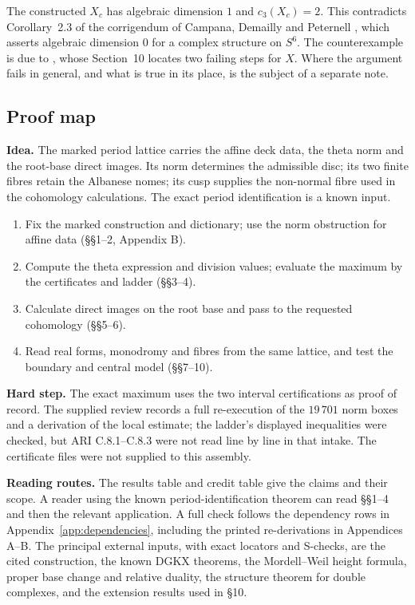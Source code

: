The constructed $X_c$ has algebraic dimension $1$ and $c_3(X_c)=2$. This contradicts Corollary~2.3 of the corrigendum of Campana, Demailly and Peternell \cite[Corollary 2.3]{CDP20}, which asserts algebraic dimension $0$ for a complex structure on $S^6$. The counterexample is due to \cite[Main Theorem; Section 10]{AC26}, whose Section~10 locates two failing steps for $X$. Where the argument fails in general, and what is true in its place, is the subject of a separate note.

\subsection*{Proof map}
\textbf{Idea.} The marked period lattice carries the affine deck data, the theta norm and the root-base direct images. Its norm determines the admissible disc; its two finite fibres retain the Albanese nomes; its cusp supplies the non-normal fibre used in the cohomology calculations. The exact period identification is a known input.
\begin{enumerate}[leftmargin=*,label=\arabic*.]
\item Fix the marked construction and dictionary; use the norm obstruction for affine data (\S\S1--2, Appendix B).
\item Compute the theta expression and division values; evaluate the maximum by the certificates and ladder (\S\S3--4).
\item Calculate direct images on the root base and pass to the requested cohomology (\S\S5--6).
\item Read real forms, monodromy and fibres from the same lattice, and test the boundary and central model (\S\S7--10).
\end{enumerate}
\textbf{Hard step.} The exact maximum uses the two interval certifications as proof of record. The supplied review records a full re-execution of the $19\,701$ norm boxes and a derivation of the local estimate; the ladder's displayed inequalities were checked, but ARI C.8.1--C.8.3 were not read line by line in that intake. The certificate files were not supplied to this assembly.

\textbf{Reading routes.} The results table and credit table give the claims and their scope. A reader using the known period-identification theorem can read \S\S1--4 and then the relevant application. A full check follows the dependency rows in Appendix~\ref{app:dependencies}, including the printed re-derivations in Appendices A--B. The principal external inputs, with exact locators and S-checks, are the cited construction, the known DGKX theorems, the Mordell--Weil height formula, proper base change and relative duality, the structure theorem for double complexes, and the extension results used in \S10.
\clearpage
